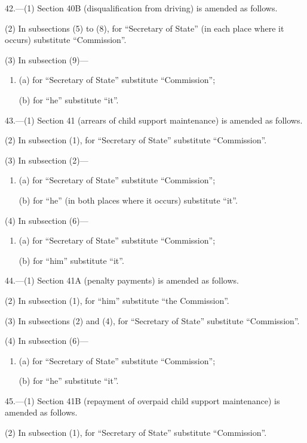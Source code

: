 \documentclass[a4paper]{article}
\begin{document}
\medskip

42.---(1) Section 40B (disqualification from driving) is amended as follows.

(2) In subsections (5) to (8), for “Secretary of State” (in each place where it occurs) substitute “Commission”.

(3) In subsection (9)—
\begin{enumerate}\item[]
(a) for “Secretary of State” substitute “Commission”;

(b) for “he” substitute “it”.
\end{enumerate}

\medskip

43.---(1) Section 41 (arrears of child support maintenance) is amended as follows.

(2) In subsection (1), for “Secretary of State” substitute “Commission”.

(3) In subsection (2)—
\begin{enumerate}\item[]
(a) for “Secretary of State” substitute “Commission”;

(b) for “he” (in both places where it occurs) substitute “it”.
\end{enumerate}

(4) In subsection (6)—
\begin{enumerate}\item[]
(a) for “Secretary of State” substitute “Commission”;

(b) for “him” substitute “it”.
\end{enumerate}

44.---(1) Section 41A (penalty payments) is amended as follows.

(2) In subsection (1), for “him” substitute “the Commission”.

(3) In subsections (2) and (4), for “Secretary of State” substitute “Commission”.

(4) In subsection (6)—
\begin{enumerate}\item[]
(a) for “Secretary of State” substitute “Commission”;

(b) for “he” substitute “it”.
\end{enumerate}

\medskip

45.---(1) Section 41B (repayment of overpaid child support maintenance) is amended as follows.

(2) In subsection (1), for “Secretary of State” substitute “Commission”.
\end{document}
